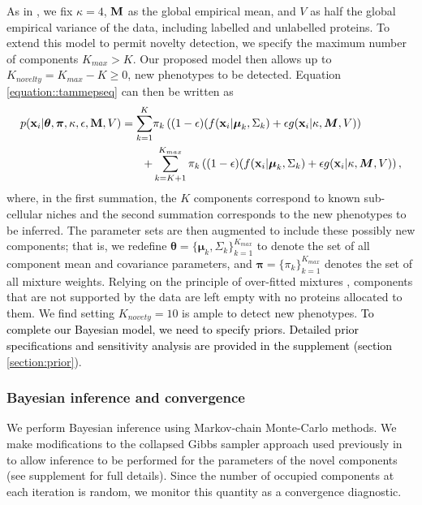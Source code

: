 \documentclass[12pt,english]{article}
\begin{document}
As in \cite{Crook:2018}, we fix $\kappa = 4$, ${\bf M}$ as the global empirical mean, and $V$
as half the global empirical variance of the data, including labelled and unlabelled proteins. To extend this model to permit novelty detection, we specify the maximum number of components $K_{max} > K$. Our proposed model then allows up to $K_{novelty} = K_{max} - K \geq 0$, new phenotypes to be detected. Equation \ref{equation::tammepseq} can then be written as 
\begin{equation}\label{equation::tammepseq2}
\begin{split}
p({\bf x}_i| \boldsymbol{\theta}, \boldsymbol{\pi} , \kappa, \epsilon, {\bf M}, V) =  \sum_{k=1}^{K}&\pi_k\left((1-\epsilon)(f({\bf x}_i |\boldsymbol{\mu}_k, \Sigma_k) + \epsilon g({\bf x}_i|\kappa, \boldsymbol{M}, V)\right)\\
+ & \sum_{k=K+1}^{K_{max}}\pi_k\left((1-\epsilon)(f({\bf x}_i |\boldsymbol{\mu}_k, \Sigma_k) + \epsilon g({\bf x}_i|\kappa, \boldsymbol{M}, V)\right),
\end{split}
\end{equation}
where, in the first summation, the $K$ components correspond to known sub-cellular niches and the second summation corresponds to the new phenotypes to be inferred. The parameter sets are then augmented to include these possibly new components; that is, we redefine 
$\boldsymbol{\theta} = \{\boldsymbol{\mu}_k, \Sigma_k \}_{k = 1}^{K_{max}}$
to denote the set of all component mean and covariance parameters, and
$\boldsymbol{\pi} = \{\pi_k\}_{k = 1}^{K_{max}}$ denotes the set of all mixture
weights. Relying on the principle of over-fitted mixtures \citep{Rousseau::2011}, components that are not supported by the data are left empty with no proteins allocated to them. We find setting $K_{novety} = 10$ is ample to detect new phenotypes. \textcolor{black}{To complete our Bayesian model, we need to specify priors. Detailed prior specifications and sensitivity analysis are provided in the supplement (section \ref{section:prior}}).   
\subsubsection{Bayesian inference and convergence}
We perform Bayesian inference using Markov-chain Monte-Carlo methods. We make modifications to the collapsed Gibbs sampler approach used previously in \cite{Crook:2018} to allow inference to be performed for the parameters of the novel components (see supplement for full details). Since the number of occupied components at each iteration is random, we monitor this quantity as a convergence diagnostic.
\end{document}
